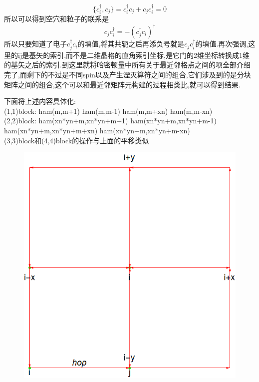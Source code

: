 \documentclass[a4paper,12pt]{ctexart}
\numberwithin{equation}{section}
\begin{document}
\begin{equation}
\{c^\dagger_i,c_j\}=c^\dagger_ic_j+c_jc^\dagger_i=0
\end{equation}
所以可以得到空穴和粒子的联系是
\begin{equation}
c_jc^\dagger_i=-(c_j^\dagger c_i)^\dagger
\end{equation}
所以只要知道了电子$c_j^\dagger c_i$的填值,将其共轭之后再添负号就是$c_jc_i^\dagger$的填值.再次强调,这里的ij是基矢的索引,而不是二维晶格的直角索引坐标,是它门的2维坐标转换成1维的基矢之后的索引.到这里就将哈密顿量中所有关于最近邻格点之间的项全部介绍完了,而剩下的不过是不同spin以及产生湮灭算符之间的组合,它们涉及到的是分块矩阵之间的组合,这个可以和最近邻矩阵元构建的过程相类比,就可以得到结果.

下面将上述内容具体化:\\
(1,1)block:  ham(m,m+1)   ham(m,m-1)   ham(m,m+xn)   ham(m,m-xn)\\
(2,2)block: ham(xn*yn+m,xn*yn+m+1)   ham(xn*yn+m,xn*yn+m-1)   ham(xn*yn+m,xn*yn+m+xn)   ham(xn*yn+m,xn*yn+m-xn)\\
(3,3)block和(4,4)block的操作与上面的平移类似
\begin{figure}[h]
	\centering
	\includegraphics[scale=0.6]{lattice.png}
\end{figure}
\end{document}
